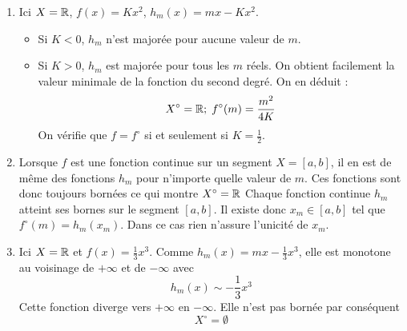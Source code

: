 \begin{enumerate}
\item Ici $X=\mathbb{R}$, $f(x)=Kx^{2}$, $h_m(x)=mx-Kx^2$.
\begin{itemize}
 \item Si $K<0$, $h_m$ n'est majorée pour aucune valeur de $m$.
 \item Si $K>0$, $h_m$ est majorée pour tous les $m$ réels. On obtient facilement la valeur minimale de la fonction du second degré. On en déduit :
\begin{displaymath}
 X^\circ =\mathbb{R} ;\; f^\circ (m)=\dfrac{m^2}{4K}
\end{displaymath}
On vérifie que $f=f^\circ$ si et seulement si $K=\frac{1}{2}$.
\end{itemize}

\item  Lorsque $f$ est une fonction continue sur un segment $X=\left[a,b\right] $, il en est de m\^{e}me des fonctions $h_{m}$ pour n'importe quelle valeur de $m$. Ces fonctions sont donc toujours born\'{e}es ce qui montre $X^\circ =\mathbb{R}$ \newline
Chaque fonction continue $h_{m}$ atteint ses bornes sur le segment $\left[ a,b\right] $. Il existe donc $x_{m}\in \left[a,b\right]$ tel que $f^{\circ }(m)=h_{m}(x_{m})$. Dans ce cas rien n'assure l'unicité de $x_m$.

\item  Ici $X=\mathbb{R}$ et $f(x)=\frac{1}{3}x^{3}$. Comme $h_{m}(x)=mx-\frac{1}{3}x^{3}$, elle est monotone au voisinage de $+\infty $ et de $-\infty $ avec
\[
h_{m}(x)\sim -\frac{1}{3}x^{3}
\]
Cette fonction diverge vers $+\infty $ en $-\infty $. Elle n'est pas born\'{e}e par cons\'{e}quent
\[
X^{\circ }=\emptyset
\]


\end{enumerate}
